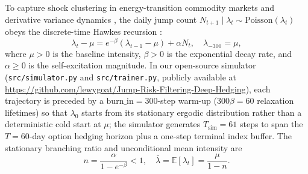 \documentclass[11pt,a4paper]{article}
\begin{document}
To capture shock clustering in energy-transition commodity markets \citep{Brignone2023,Mercuri2024} and derivative variance dynamics \citep{deTruchis2025,HeYan2026}, the daily jump count $N_{t+1} \mid \lambda_t \sim \text{Poisson}(\lambda_t)$ obeys the discrete-time Hawkes recursion \citep{Hawkes1971,ChenClements2024}:
\begin{equation}
  \lambda_t - \mu = e^{-\beta}(\lambda_{t-1} - \mu) + \alpha N_t, \quad \lambda_{-300} = \mu,
  \label{eq:hawkes_recursion}
\end{equation}
where $\mu > 0$ is the baseline intensity, $\beta > 0$ is the exponential decay rate, and $\alpha \ge 0$ is the self-excitation magnitude. In our open-source simulator (\texttt{src/simulator.py} and \texttt{src/trainer.py}, publicly available at \url{https://github.com/lewygoat/Jump-Risk-Filtering-Deep-Hedging}), each trajectory is preceded by a $\text{burn\_in} = 300$-step warm-up ($300\beta = 60$ relaxation lifetimes) so that $\lambda_0$ starts from its stationary ergodic distribution rather than a deterministic cold start at $\mu$; the simulator generates $T_{\text{sim}} = 61$ steps to span the $T = 60$-day option hedging horizon plus a one-step terminal index buffer. The stationary branching ratio and unconditional mean intensity are
\begin{equation}
  n = \frac{\alpha}{1 - e^{-\beta}} < 1, \quad \bar{\lambda} = \mathbb{E}[\lambda_t] = \frac{\mu}{1 - n}.
  \label{eq:branching_ratio}
\end{equation}
\end{document}
